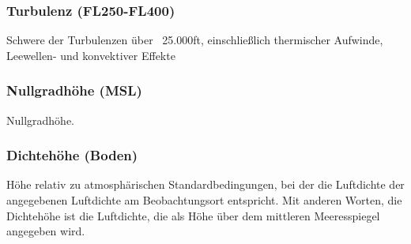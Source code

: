 \documentclass[11pt,a4paper]{article}
\begin{document}
\subsubsection{Turbulenz (FL250-FL400)}
Schwere der Turbulenzen über ~25.000ft, einschließlich thermischer Aufwinde, Leewellen- und konvektiver Effekte
\subsubsection{Nullgradhöhe (MSL)}
Nullgradhöhe.
\subsubsection{Dichtehöhe (Boden)}
Höhe relativ zu atmosphärischen Standardbedingungen, bei der die Luftdichte der angegebenen Luftdichte am Beobachtungsort entspricht. Mit anderen Worten, die Dichtehöhe ist die Luftdichte, die als Höhe über dem mittleren Meeresspiegel angegeben wird.
\end{document}
